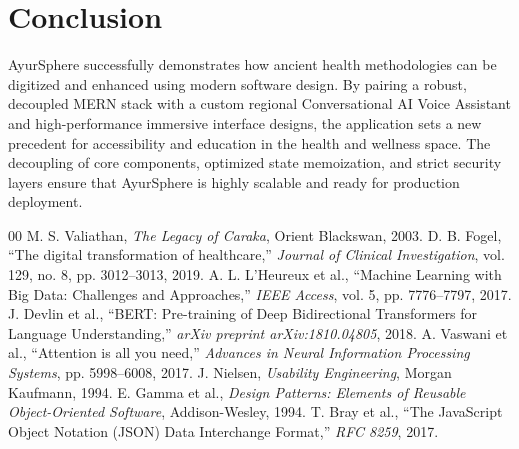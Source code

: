\documentclass[conference]{IEEEtran}
\begin{document}
\section{Conclusion}
AyurSphere successfully demonstrates how ancient health methodologies can be digitized and enhanced using modern software design. By pairing a robust, decoupled MERN stack with a custom regional Conversational AI Voice Assistant and high-performance immersive interface designs, the application sets a new precedent for accessibility and education in the health and wellness space. The decoupling of core components, optimized state memoization, and strict security layers ensure that AyurSphere is highly scalable and ready for production deployment.

\begin{thebibliography}{00}
 M. S. Valiathan, \emph{The Legacy of Caraka}, Orient Blackswan, 2003.
 D. B. Fogel, ``The digital transformation of healthcare,'' \emph{Journal of Clinical Investigation}, vol. 129, no. 8, pp. 3012--3013, 2019.
 A. L. L'Heureux et al., ``Machine Learning with Big Data: Challenges and Approaches,'' \emph{IEEE Access}, vol. 5, pp. 7776--7797, 2017.
 J. Devlin et al., ``BERT: Pre-training of Deep Bidirectional Transformers for Language Understanding,'' \emph{arXiv preprint arXiv:1810.04805}, 2018.
 A. Vaswani et al., ``Attention is all you need,'' \emph{Advances in Neural Information Processing Systems}, pp. 5998--6008, 2017.
 J. Nielsen, \emph{Usability Engineering}, Morgan Kaufmann, 1994.
 E. Gamma et al., \emph{Design Patterns: Elements of Reusable Object-Oriented Software}, Addison-Wesley, 1994.
 T. Bray et al., ``The JavaScript Object Notation (JSON) Data Interchange Format,'' \emph{RFC 8259}, 2017.
\end{thebibliography}
\end{document}
